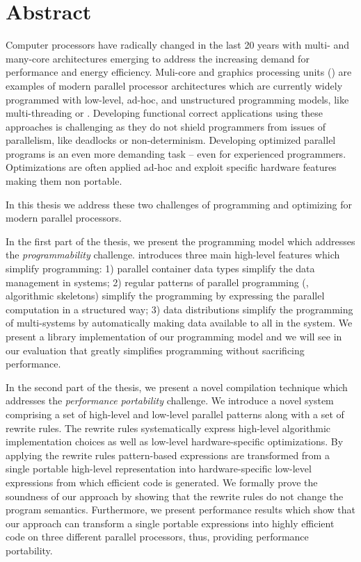 \chapter*{Abstract}\label{abstract}

Computer processors have radically changed in the last 20 years with multi- and many-core architectures emerging to address the increasing demand for performance and energy efficiency.
Muli-core \CPUs and graphics processing units (\GPUs) are examples of modern parallel processor architectures which are currently widely programmed with low-level, ad-hoc, and unstructured programming models, like multi-threading or \OpenCL.
Developing functional correct applications using these approaches is challenging as they do not shield programmers from issues of parallelism, like deadlocks or non-determinism.
Developing optimized parallel programs is an even more demanding task -- even for experienced programmers.
Optimizations are often applied ad-hoc and exploit specific hardware features making them non portable.

In this thesis we address these two challenges of programming and optimizing for modern parallel processors.

In the first part of the thesis, we present the \SkelCL programming model which addresses the \emph{programmability} challenge.
\SkelCL introduces three main high-level features which simplify \GPU programming:
1) parallel container data types simplify the data management in \GPU systems;
2) regular patterns of parallel programming (\aka, algorithmic skeletons) simplify the programming by expressing the parallel computation in a structured way;
3) data distributions simplify the programming of multi-\GPU systems by automatically making data available to all \GPUs in the system.
We present a \Cpp library implementation of our programming model and we will see in our evaluation that \SkelCL greatly simplifies \GPU programming without sacrificing performance.

In the second part of the thesis, we present a novel compilation technique which addresses the \emph{performance portability} challenge.
We introduce a novel system comprising a set of high-level and low-level parallel patterns along with a set of rewrite rules.
The rewrite rules systematically express high-level algorithmic implementation choices as well as low-level hardware-specific optimizations.
By applying the rewrite rules pattern-based expressions are transformed from a single portable high-level representation into hardware-specific low-level expressions from which efficient \OpenCL code is generated.
We formally prove the soundness of our approach by showing that the rewrite rules do not change the program semantics.
Furthermore, we present performance results which show that our approach can transform a single portable expressions into highly efficient code on three different parallel processors, thus, providing performance portability.

